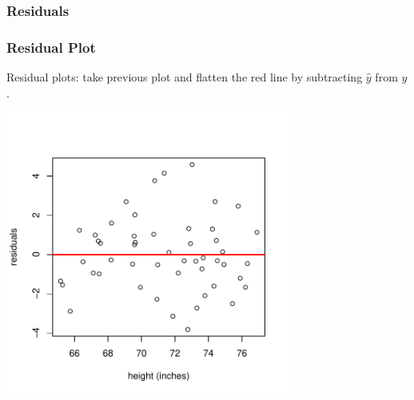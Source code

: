 \documentclass[handout]{beamer}
\newcommand{\blue}[1]{\textcolor{blue2}{#1}}
\begin{document}
\begin{frame}
\frametitle{Residuals}
%
%
%
\end{frame}


\begin{frame}
\frametitle{Residual Plot}
Residual plots: take previous plot and flatten the red line by subtracting $\widehat{y}$ from $y$.

\begin{center}
\includegraphics[width=0.7\textwidth]{figure/residuals.pdf}
\end{center}

\end{frame}
\end{document}
